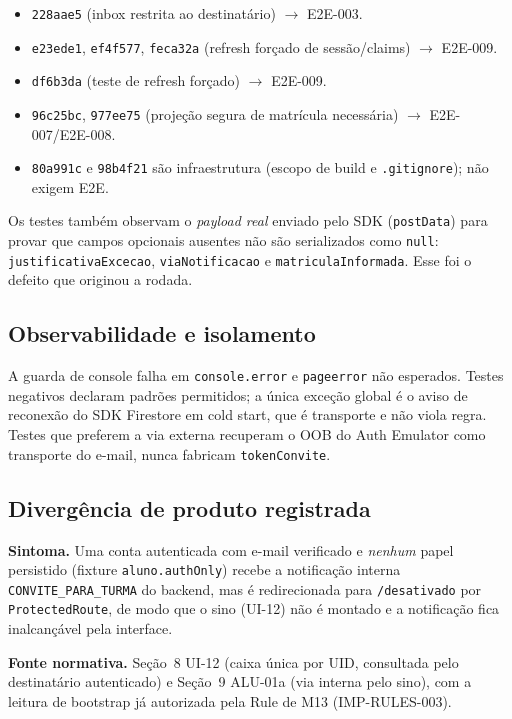 \begin{itemize}
  \item \texttt{228aae5} (inbox restrita ao destinatário) $\rightarrow$ E2E-003.
  \item \texttt{e23ede1}, \texttt{ef4f577}, \texttt{feca32a} (refresh forçado de
    sessão/claims) $\rightarrow$ E2E-009.
  \item \texttt{df6b3da} (teste de refresh forçado) $\rightarrow$ E2E-009.
  \item \texttt{96c25bc}, \texttt{977ee75} (projeção segura de matrícula
    necessária) $\rightarrow$ E2E-007/E2E-008.
  \item \texttt{80a991c} e \texttt{98b4f21} são infraestrutura (escopo de build
    e \texttt{.gitignore}); não exigem E2E.
\end{itemize}

Os testes também observam o \emph{payload real} enviado pelo SDK
(\texttt{postData}) para provar que campos opcionais ausentes não são
serializados como \texttt{null}: \texttt{justificativaExcecao},
\texttt{viaNotificacao} e \texttt{matriculaInformada}. Esse foi o defeito que
originou a rodada.

\subsection{Observabilidade e isolamento}

A guarda de console falha em \texttt{console.error} e \texttt{pageerror} não
esperados. Testes negativos declaram padrões permitidos; a única exceção global
é o aviso de reconexão do SDK Firestore em cold start, que é transporte e não
viola regra. Testes que preferem a via externa recuperam o OOB do Auth Emulator
como transporte do e-mail, nunca fabricam \texttt{tokenConvite}.

\subsection{Divergência de produto registrada}

\textbf{Sintoma.} Uma conta autenticada com e-mail verificado e \emph{nenhum}
papel persistido (fixture \texttt{aluno.authOnly}) recebe a notificação interna
\texttt{CONVITE\_PARA\_TURMA} do backend, mas é redirecionada para
\texttt{/desativado} por \texttt{ProtectedRoute}, de modo que o sino (UI-12) não
é montado e a notificação fica inalcançável pela interface.

\textbf{Fonte normativa.} Seção~8 UI-12 (caixa única por UID, consultada pelo
destinatário autenticado) e Seção~9 ALU-01a (via interna pelo sino), com a
leitura de bootstrap já autorizada pela Rule de M13 (IMP-RULES-003).

